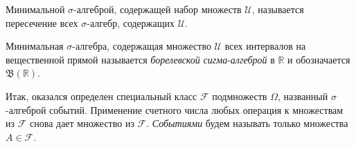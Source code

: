 \begin{to_def}
    Минимальной $\sigma$-алгеброй, содержащей набор множеств $\mathcal U$, называется пересечение всех $\sigma$-алгебр, содержащих $\mathcal U$. 
\end{to_def}


\begin{to_def}
    Минимальная $\sigma$-алгебра, содержащая множество $\mathcal U$ всех интервалов на вещественной прямой называется \textit{борелевской} \textit{сигма}-\textit{алгеброй} в $\mathbb{R}$ и обозначается $\mathfrak B (\mathbb{R})$.
\end{to_def}

Итак, оказался определен специальный класс $\mathcal F$ подмножеств $\Omega$, названный $\sigma$-алгеброй событий. Применение счетного числа любых операция к множествам из $\mathcal F$ снова дает множество из $\mathcal F$. \textit{Событиями} будем называть только множества $A \in \mathcal F$.